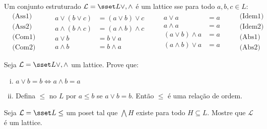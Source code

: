 \begin{definition}
	Um conjunto estruturado $\mathcal{L} = \sset L {\vee, \wedge}$ é um lattice sse para todo $a, b, c \in L$:
	$$
		\left.
			\begin{aligned}
				&\text{(Ass1)}\\
				&\text{(Ass2)}\\
				&\text{(Com1)}\\
				&\text{(Com2)}
			\end{aligned}
		\right.
		\qquad
		\left.
			\begin{aligned}
				a \vee (b \vee c) &= (a \vee b) \vee c\\
				a \wedge (b \wedge c) &= (a \wedge b) \wedge c\\
				a \vee b &= b \vee a\\
				a \wedge b &= b \wedge a
			\end{aligned}
		\right.
		\qquad
		\left.
			\begin{aligned}
				a \vee a &= a\\
				a \wedge a &= a\\
				(a \vee b) \wedge a &= a\\
				(a \wedge b) \vee a &= a
			\end{aligned}
		\right.
		\qquad
		\left.
			\begin{aligned}
				\text{(Idem1)}\\
				\text{(Idem2)}\\
				\text{(Abs1)}\\
				\text{(Abs2)}
			\end{aligned}
		\right.
	$$
\end{definition}

\begin{exercise}
	Seja $\mathcal{L} = \sset L {\vee, \wedge}$ um lattice. Prove que:
	\begin{enumerate}[(i)]
		\item $a \vee b = b \iff a \wedge b = a$
		\item Defina $\leq$ no $L$ por $a \leq b$ se $a \vee b = b$. Então $\leq$ é uma relação de ordem.
	\end{enumerate}
\end{exercise}

\begin{exercise}
	Seja $\mathcal{L} = \sset L \leq$ um poset tal que $\bigwedge H$ existe para todo $H \subseteq L$. Mostre que $\mathcal{L}$ é um lattice.
\end{exercise}

